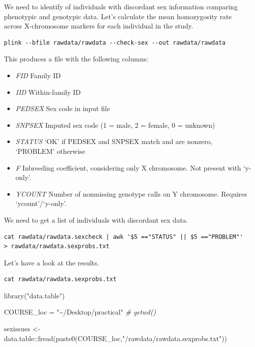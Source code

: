 \documentclass[
]{book}
\newenvironment{Shaded}{\begin{snugshade}}{\end{snugshade}}
\newcommand{\CommentTok}[1]{\textcolor[rgb]{0.56,0.35,0.01}{\textit{#1}}}
\newcommand{\FunctionTok}[1]{\textcolor[rgb]{0.00,0.00,0.00}{#1}}
\newcommand{\NormalTok}[1]{#1}
\newcommand{\OtherTok}[1]{\textcolor[rgb]{0.56,0.35,0.01}{#1}}
\newcommand{\SpecialCharTok}[1]{\textcolor[rgb]{0.00,0.00,0.00}{#1}}
\newcommand{\StringTok}[1]{\textcolor[rgb]{0.31,0.60,0.02}{#1}}
\providecommand{\tightlist}{%
  \setlength{\itemsep}{0pt}\setlength{\parskip}{0pt}}
\begin{document}
We need to identify of individuals with discordant sex information comparing phenotypic and genotypic data. Let's calculate the mean homozygosity rate across X-chromosome markers for each individual in the study.

\begin{verbatim}
plink --bfile rawdata/rawdata --check-sex --out rawdata/rawdata
\end{verbatim}

This produces a file with the following columns:

\begin{itemize}
\tightlist
\item
  \emph{FID} Family ID
\item
  \emph{IID} Within-family ID
\item
  \emph{PEDSEX} Sex code in input file
\item
  \emph{SNPSEX} Imputed sex code (1 = male, 2 = female, 0 = unknown)
\item
  \emph{STATUS} `OK' if PEDSEX and SNPSEX match and are nonzero, `PROBLEM' otherwise
\item
  \emph{F} Inbreeding coefficient, considering only X chromosome. Not present with `y-only'.
\item
  \emph{YCOUNT} Number of nonmissing genotype calls on Y chromosome. Requires `ycount'/`y-only'.
\end{itemize}

We need to get a list of individuals with discordant sex data.

\begin{verbatim}
cat rawdata/rawdata.sexcheck | awk '$5 =="STATUS" || $5 =="PROBLEM"'  > rawdata/rawdata.sexprobs.txt
\end{verbatim}

Let's have a look at the results.

\begin{verbatim}
cat rawdata/rawdata.sexprobs.txt
\end{verbatim}

\begin{Shaded}
\begin{Highlighting}[]
\FunctionTok{library}\NormalTok{(}\StringTok{"data.table"}\NormalTok{)}

\NormalTok{COURSE\_loc }\OtherTok{=} \StringTok{"\textasciitilde{}/Desktop/practical"} \CommentTok{\# getwd()}

\NormalTok{sexissues }\OtherTok{\textless{}{-}}\NormalTok{ data.table}\SpecialCharTok{::}\FunctionTok{fread}\NormalTok{(}\FunctionTok{paste0}\NormalTok{(COURSE\_loc,}\StringTok{"/rawdata/rawdata.sexprobs.txt"}\NormalTok{))}
\end{Highlighting}
\end{Shaded}
\end{document}
